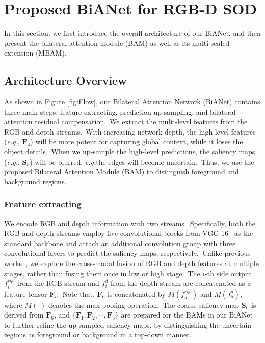 \documentclass[journal]{IEEEtran}
\def\eg{\emph{e.g.}}
\newcommand{\figref}[1]{Figure \ref{#1}}
\begin{document}
\section{Proposed BiANet for RGB-D SOD}
\label{sec:method}
In this section, we first introduce the overall architecture of our BiANet, and then present the bilateral attention module (BAM) as well as its multi-scaled extension (MBAM).


\subsection{Architecture Overview}
As shown in \figref{fig:Flow}, our Bilateral Attention Network (BiANet) contains three main steps: feature extracting, prediction up-sampling, and bilateral attention residual compensation.\
We extract the multi-level features from the RGB and depth streams.\
With increasing network depth, the high-level features (\eg, $\mathbf{F}_4$) will be more potent for capturing global context,
while it loses the object details.\
When we up-sample the high-level predictions, the saliency maps (\eg, $\mathbf{S}_5$) will be blurred, \eg the edges will become uncertain.\
Thus, we use the proposed Bilateral Attention Module (BAM) to distinguish foreground and background regions.\


\subsubsection{Feature extracting}
We encode RGB and depth information with two streams.\
Specifically, both the RGB and depth streams employ five convolutional blocks from VGG-16~\cite{simonyan2015vgg} as the standard backbone
and attach an additional convolution group with three convolutional layers to predict the saliency maps, respectively.\
Unlike previous works~\cite{han2017cnns,zhu2019pdnet,chen2019multi},
we explore the cross-modal fusion of RGB and depth features at multiple stages, rather than fusing them once in low or high stage.\
The $i$-th side output $f_i^{rgb}$ from the RGB stream and $f_i^{d}$ from the depth stream are concatenated as a feature tensor $\mathbf{F}_i$.\
Note that, $\mathbf{F}_6$ is concatenated by $M(f_5^{rgb})$ and $M(f_5^{d})$, where $M(\cdot)$ denotes the max-pooling operation.\
The coarse saliency map $\mathbf{S}_6$ is derived from $\mathbf{F}_6$, 
and $\{\mathbf{F}_1,\mathbf{F}_2,\cdots,\mathbf{F}_5\}$ are prepared for the BAMs in our BiANet to further refine the up-sampled saliency maps, by distinguishing the uncertain regions as foreground or background in a top-down manner.
\end{document}
